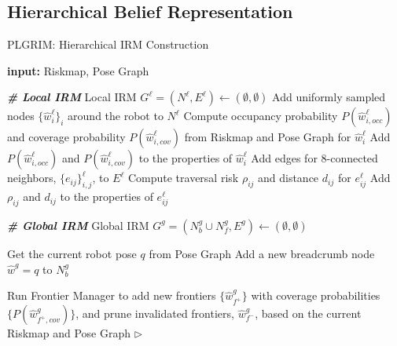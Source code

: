 \documentclass[letterpaper]{article} %
\begin{document}
\subsection{Hierarchical Belief Representation} \label{ssec:belief-managers}
\begin{algorithm}[t!]
{\fontsize{8.5pt}{9.8pt}\selectfont
\caption{PLGRIM: Hierarchical IRM Construction}
\label{alg:IRMs}
\begin{algorithmic}
  \STATE \textbf{input:} Riskmap, Pose Graph %

  \vspace{3pt}
  \STATE \textbf{\textit{\# Local IRM}}
  \STATE Local IRM $G^\ell = (N^\ell, E^\ell) \gets (\emptyset, \emptyset)$
  \STATE Add uniformly sampled nodes $\{\hat{w}^\ell_i\}_i$ around the robot to $N^\ell$
    \STATE Compute occupancy probability $P(\hat{w}^\ell_{i,occ})$ and coverage probability $P(\hat{w}^\ell_{i,cov})$ from Riskmap and Pose Graph for $\hat{w}^\ell_i$
    \STATE Add $P(\hat{w}^\ell_{i,occ})$ and $P(\hat{w}^\ell_{i,cov})$ to the properties of $\hat{w}^\ell_i$
  \ENDFOR
  \STATE Add edges for 8-connected neighbors, $\{e_{ij}\}^\ell_{i,j}$, to $E^\ell$
    \STATE Compute traversal risk $\rho_{ij}$ and distance $d_{ij}$ for $e^\ell_{ij}$
    \STATE Add $\rho_{ij}$ and $d_{ij}$ to the properties of $e^\ell_{ij}$
  \ENDFOR

  \vspace{3pt}
  \STATE \textbf{\textit{\# Global IRM}}
    \STATE Global IRM $G^g = (N^g_b \cup N^g_f, E^g) \gets (\emptyset, \emptyset)$
  \ENDIF
  
  \STATE Get the current robot pose $q$ from Pose Graph
    \STATE Add a new breadcrumb node $\hat{w}^g = q$ to $N^g_b$
  \ENDIF


  \STATE Run Frontier Manager to add new frontiers $\{\hat{w}^g_{f^+}\}$ with coverage probabilities $\{P(\hat{w}^g_{f^+,cov})\}$, and prune invalidated frontiers, $\hat{w}^g_{f^-}$, based on the current Riskmap and Pose Graph
  \STATE \hspace{4.5cm} $\triangleright$ \cite{keidar2012robot}


\end{algorithmic}}
\end{algorithm}
\end{document}
